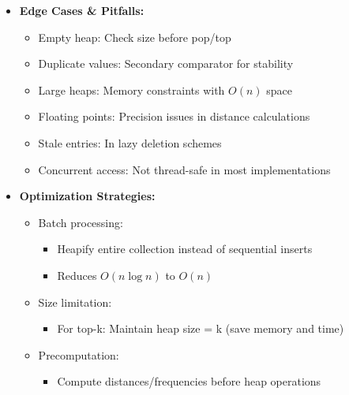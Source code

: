 \documentclass[a4paper,10pt]{book}
\begin{document}
\begin{itemize}
    \item \textbf{Edge Cases \& Pitfalls:}
    \begin{itemize}
        \item Empty heap: Check size before pop/top
        \item Duplicate values: Secondary comparator for stability
        \item Large heaps: Memory constraints with $O(n)$ space
        \item Floating points: Precision issues in distance calculations
        \item Stale entries: In lazy deletion schemes
        \item Concurrent access: Not thread-safe in most implementations
    \end{itemize}
    
    \item \textbf{Optimization Strategies:}
    \begin{itemize}
        \item Batch processing:
        \begin{itemize}
            \item Heapify entire collection instead of sequential inserts
            \item Reduces $O(n \log n)$ to $O(n)$
        \end{itemize}
        \item Size limitation:
        \begin{itemize}
            \item For top-k: Maintain heap size = k (save memory and time)
        \end{itemize}
        \item Precomputation:
        \begin{itemize}
            \item Compute distances/frequencies before heap operations
        \end{itemize}
    \end{itemize}
    

\end{itemize}
\end{document}
